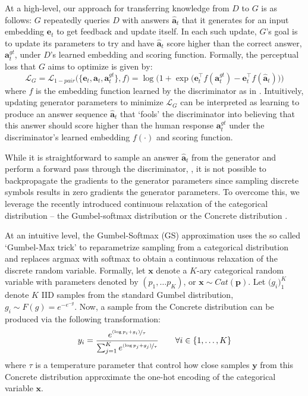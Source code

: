 \documentclass{article}
\begin{document}
At a high-level, our approach for transferring knowledge from $D$ to $G$ is as follows: 
$G$ repeatedly queries $D$ with answers $\bm{\hat{a}}_t$ that it generates for an input embedding $\bm{e}_t$  
to get feedback and update itself. 
In each such update, $G$'s goal is to update its parameters to try and have $\bm{\hat{a}}_t$ score higher than the correct answer, $\bm{a}^{gt}_t$, under $D$'s learned embedding and scoring function. 
Formally, the perceptual loss that $G$ aims to optimize is given by:
\begin{equation}
 \mathcal{L}_{G} = 
 \mathcal{L}_{1-pair} \Big( \{ \bm{e}_t, \bm{\hat{a}}_t, \bm{a}^{gt}_t\},f\Big) 
 = 
 \log \bigg(1 + \exp \Big(\bm{e}_t^\top f(\bm{a}^{gt}_t) - \bm{e}_t^\top f(\bm{\hat{a}}_t) \Big)
 \bigg)   \label{eq:LG_loss}
\end{equation}
where $f$ is the embedding function learned by the discriminator as in . 
Intuitively, updating generator parameters to minimize $\mathcal{L}_{G}$ can be interpreted as 
learning to produce an answer sequence $\bm{\hat{a}}_t$ that `fools' the discriminator into believing 
that this answer should score higher than the human response
$\bm{a}_t^{gt}$
under the discriminator's learned 
embedding $f(\cdot)$ and scoring function. 

While it is straightforward to sample an answer $\bm{\hat{a}}_t$  from the generator and perform a forward pass 
through the discriminator, \naively, it is not possible to backpropagate the gradients to the generator parameters 
since sampling discrete symbols results in zero gradients \wrt the generator parameters. 
To overcome this, we leverage the recently introduced 
continuous relaxation of the categorical distribution -- the Gumbel-softmax distribution or the Concrete distribution 
\cite{jang2016categorical, maddison2016concrete}. 

At an intuitive level, the Gumbel-Softmax (GS) approximation uses the so called `Gumbel-Max trick' to reparametrize sampling 
from a categorical distribution and replaces argmax with softmax to obtain a continuous relaxation of the discrete random 
variable. Formally, let $\bm{x}$ denote a $K$-ary categorical random variable with parameters denoted by 
$(p_1,\ldots p_K)$, or $\bm{x} \sim Cat(\bm{p})$. Let $\big(g_i\big)_1^K$ denote $K$ IID samples from the standard Gumbel distribution, 
$g_i \sim F(g) = e^{-e^{-g}}$. Now, a sample from the Concrete distribution can be produced via the following transformation: 
\begin{equation}
y_i = \frac{ e^{\nicefrac{(\log{p_i} + g_i)}{ \tau}} }
{ \sum_{j=1}^K e^{\nicefrac{(\log{p_j} + g_j)}{ \tau}}} \qquad \forall i \in \{1,\ldots, K\}
\end{equation}
where $\tau$ is a temperature parameter that control how close samples $\bm{y}$ from this Concrete distribution approximate the 
one-hot encoding of the categorical variable $\bm{x}$. 
\end{document}
